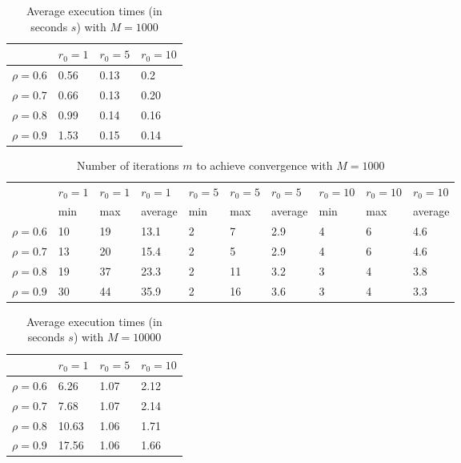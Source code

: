 \documentclass[a4paper,11pt,openright]{report}
\begin{document}
\begin{table}[H]
\centering
\addtolength{\leftskip}{-1.5cm}
\addtolength{\rightskip}{-1.5cm}
\begin{tabular}{|c|lll|}
\hline
$ $ & $r_0 = 1$ & $r_0 = 5$ & $r_0 = 10$ \\
\hline
$\rho = 0.6$ & 0.56 & 0.13 & 0.2 \\

$\rho = 0.7$ & 0.66 & 0.13 & 0.20 \\

$\rho = 0.8$ & 0.99 & 0.14 & 0.16 \\

$\rho = 0.9$ & 1.53 & 0.15 & 0.14 \\
\hline
\end{tabular}
\caption{Average execution
 times (in seconds $s$) with $M = 1000$}
\end{table}
\begin{table}[H]
\centering
\addtolength{\leftskip}{-1.5cm}
\addtolength{\rightskip}{-1.5cm}
\begin{tabular}{|c|lllllllll|}
\hline
$ $ & $r_0 = 1$ & $r_0 = 1$ & $r_0 = 1$ & $r_0 = 5$ & $r_0 = 5$ & $r_0 = 5$ & $r_0 = 10$ & $r_0 = 10$ & $r_0 = 10$  \\
$ $ & min & max & average & min & max & average & min & max & average \\ 
\hline
$\rho = 0.6$ & 10 & 19 & 13.1 & 2 & 7 & 2.9 & 4 & 6 & 4.6\\

$\rho = 0.7$ & 13 & 20 & 15.4 & 2 & 5 & 2.9 & 4 & 6 & 4.6\\

$\rho = 0.8$ & 19 & 37 & 23.3 & 2 & 11 & 3.2 & 3 & 4 & 3.8\\

$\rho = 0.9$ & 30 & 44 & 35.9 & 2 & 16 & 3.6 & 3 & 4 & 3.3\\
\hline
\end{tabular}
\caption{Number of iterations $m$ to achieve convergence with $M = 1000$}
\end{table}
\begin{table}[H]
\centering
\addtolength{\leftskip}{-1.5cm}
\addtolength{\rightskip}{-1.5cm}
\begin{tabular}{|c|lll|}
\hline
$ $ & $r_0 = 1$ & $r_0 = 5$ & $r_0 = 10$ \\
\hline
$\rho = 0.6$ & 6.26 & 1.07 & 2.12 \\

$\rho = 0.7$ & 7.68 & 1.07 & 2.14 \\

$\rho = 0.8$ & 10.63 & 1.06 & 1.71 \\

$\rho = 0.9$ & 17.56 & 1.06 & 1.66 \\
\hline
\end{tabular}
\caption{Average execution
 times (in seconds $s$) with $M = 10000$}
\end{table}
\end{document}
